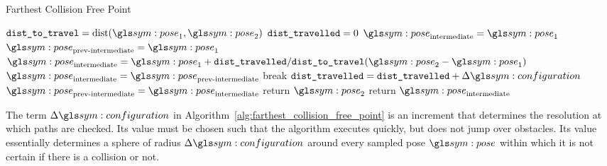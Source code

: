 	\begin{algorithm}[ht]
		\caption{Farthest Collision Free Point}%
		\label{alg:farthest_collision_free_point}
		\begin{algorithmic}[1]
				\State{}$\code{dist\_to\_travel} = \dist(\pose_1, \pose_2)$
				\State{}$\texttt{dist\_travelled} = 0$
				\State{}$\pose_\text{intermediate} = \pose_1$
				\State{}$\pose_\text{prev-intermediate} = \pose_1$
					\State{}
						\(
							\pose_\text{intermediate} =
							\pose_1 +
							\code{dist\_travelled}/\code{dist\_to\_travel}
							(
								\pose_2 - \pose_1
							)
						\)
						\State{}$\pose_\text{intermediate} =
							\pose_\text{prev-intermediate}$
						\State{}break
					\EndIf{}
					\State{}$\code{dist\_travelled} =
						\code{dist\_travelled} + \Delta\configuration$
					\State{}$\pose_\text{prev-intermediate} =
						\pose_\text{intermediate}$
				\EndWhile{}
					\State{}return $\pose_2$
				\EndIf{}
				\State{}return $\pose_\text{intermediate}$
			\EndProcedure{}
		\end{algorithmic}
	\end{algorithm}

	The term $\Delta\configuration$ in
	Algorithm~\ref{alg:farthest_collision_free_point} is an increment that
	determines the resolution at which paths are checked. Its value must be
	chosen such that the algorithm executes quickly, but does not jump over
	obstacles. Its value essentially determines a sphere of radius
	$\Delta\configuration$ around every sampled pose $\pose$ within which it
	is not certain if there is a collision or not.


